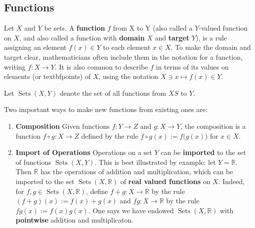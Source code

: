 \documentclass[12pt]{amsart}
\numberwithin{equation}{section}
\newcommand\Rb{{\mathbb R}} %
\newcommand{\To}{\longrightarrow}
\newcommand{\mTo}{\longmapsto}
\DeclareMathOperator{\Sets}{Sets}
\begin{document}
\subsection{Functions} Let $X$ and $Y$ be sets.  A \textbf{function} $f$ from X to Y (also called a $Y$-valued function on $X$, and also called a function with \textbf{domain} $X$ and \textbf{target} $Y$), is a rule assigning an element $f(x)\in Y$ to each element $x\in X$.  To make the domain and target clear, mathematicians often include them in the notation for a function, writing $f:X\To Y$.  It is also common to describe $f$ in terms of its values on elements (or textbf{points}) of $X$, using the notation $X\ni x\mTo{f(x)}\in Y$.

 Let $\Sets(X,Y)$ denote the set of all functions from $XS$ to $Y$.

Two important ways to make new functions from existing ones are:
\begin{enumerate}
\item \textbf{Composition} Given functions $f:Y\To Z$ and $g:X\To Y$, the composition is a function $f\circ g:X\To Z$ defined by the rule $f\circ g(x) := f(g(x)$) for $x\in X$.
\item \textbf{Import of Operations} Operations on a set $Y$ can be \textbf{imported} to the set of functions $\Sets(X,Y)$.
This is best illustrated by example: let $Y=\Rb$.  Then $\Rb$ has the operations of addition and multiplication, which can be imported to the set $\Sets(X,\Rb)$ of \textbf{real valued functions} on $X$.
  Indeed, for $ f,g\in \Sets(X,\Rb)$, define $ f+g:X\To \Rb$ by the rule $(f + g)(x):= f(x)+ g(x)$ and $ fg:X\To \Rb$ by the rule $fg(x):= f(x)g(x)$.  One says we have endowed $\Sets(X,\Rb)$ with \textbf{pointwise} addition and multiplicaton.
\end{enumerate}
\end{document}
